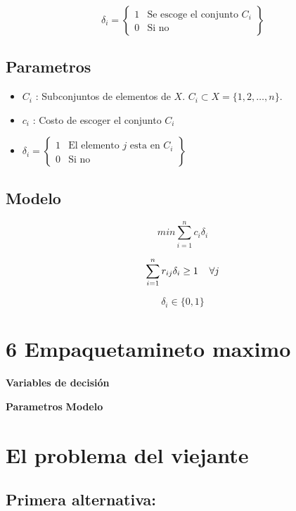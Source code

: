 \documentclass[]{article}
\begin{document}
\begin{equation*}
\delta_{i} = 
 \left\{ \begin{array}{cl}
 1 & \mbox{Se escoge el conjunto $C_i$}\\
 0 & \mbox{Si no}
 \end{array} \right\}
\end{equation*}

\subsection {Parametros}



\begin{itemize}
	\item $C_i$ : Subconjuntos de elementos de $X$. $C_i \subset X = \{1,2,\dots , n \}$. 
	\item $c_i$ : Costo de escoger el conjunto $C_i$
	\item $\delta_{i} = 
	\left\{ \begin{array}{cl}
	1 & \mbox{El elemento $j$ esta en $C_i$}\\
	0 & \mbox{Si no}
	\end{array} \right\}$
\end{itemize}

\subsection{Modelo}

$$ min \sum_{i=1}^{n} c_i\delta_i$$

$$ \sum_{i=1}^{n} r_{ij} \delta_{i} \geq 1 \hspace{0.4cm} \forall j $$

$$\delta_i \in \{0,1\}$$
\section{6 Empaquetamineto maximo }
\textbf{Variables de decisi\'on}



\textbf{Parametros}
\textbf{Modelo}


\section{El problema del viejante}

\subsection{Primera alternativa:}
\end{document}
